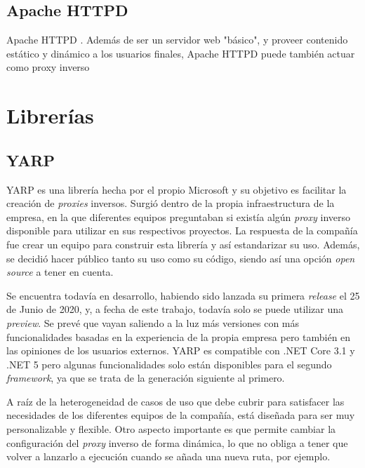 \documentclass[11pt,spanish,listoffigures]{tfgetsinf}
\begin{document}

		\subsection{Apache HTTPD}

Apache HTTPD \cite{Apache}. Además de ser un servidor web "básico", y proveer contenido estático y dinámico a los usuarios finales, Apache HTTPD puede también actuar como proxy inverso


	\section{Librerías}


		\subsection{YARP}

YARP \cite{YARP} es una librería hecha por el propio Microsoft y su objetivo es facilitar la creación de \emph{proxies} inversos. Surgió dentro de la propia infraestructura de la empresa, en la que diferentes equipos preguntaban si existía algún \emph{proxy} inverso disponible para utilizar en sus respectivos proyectos. La respuesta de la compañía fue crear un equipo para construir esta librería y así estandarizar su uso. Además, se decidió hacer público tanto su uso como su código, siendo así una opción \emph{open source} a tener en cuenta.

Se encuentra todavía en desarrollo, habiendo sido lanzada su primera \emph{release} el 25 de Junio de 2020, y, a fecha de este trabajo, todavía solo se puede utilizar una \emph{preview}. Se prevé que vayan saliendo a la luz más versiones con más funcionalidades basadas en la experiencia de la propia empresa pero también en las opiniones de los usuarios externos. YARP es compatible con .NET Core 3.1 y .NET 5 pero algunas funcionalidades solo están disponibles para el segundo \emph{framework}, ya que se trata de la generación siguiente al primero.

A raíz de la heterogeneidad de casos de uso que debe cubrir para satisfacer las necesidades de los diferentes equipos de la compañía, está diseñada para ser muy personalizable y flexible. Otro aspecto importante es que permite cambiar la configuración del \emph{proxy} inverso de forma dinámica, lo que no obliga a tener que volver a lanzarlo a ejecución cuando se añada una nueva ruta, por ejemplo.
\end{document}
